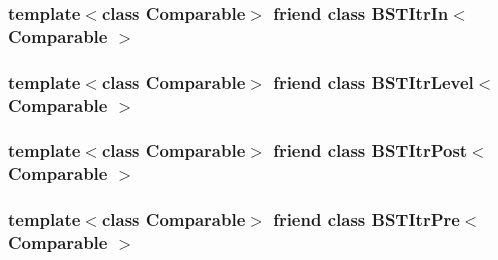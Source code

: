 \subsubsection[{B\+S\+T\+Itr\+In$<$ Comparable $>$}]{\setlength{\rightskip}{0pt plus 5cm}template$<$class Comparable$>$ friend class {\bf B\+S\+T\+Itr\+In}$<$ Comparable $>$\hspace{0.3cm}{\ttfamily [friend]}}\label{class_binary_node_aab3993acac2ab24a0b59edb0c3acc775}
\hypertarget{class_binary_node_a26ff00bc0d87069aed877f10fd3c80a8}{}
\subsubsection[{B\+S\+T\+Itr\+Level$<$ Comparable $>$}]{\setlength{\rightskip}{0pt plus 5cm}template$<$class Comparable$>$ friend class {\bf B\+S\+T\+Itr\+Level}$<$ Comparable $>$\hspace{0.3cm}{\ttfamily [friend]}}\label{class_binary_node_a26ff00bc0d87069aed877f10fd3c80a8}
\hypertarget{class_binary_node_a5dc153694be266f6e772659486219da7}{}
\subsubsection[{B\+S\+T\+Itr\+Post$<$ Comparable $>$}]{\setlength{\rightskip}{0pt plus 5cm}template$<$class Comparable$>$ friend class {\bf B\+S\+T\+Itr\+Post}$<$ Comparable $>$\hspace{0.3cm}{\ttfamily [friend]}}\label{class_binary_node_a5dc153694be266f6e772659486219da7}
\hypertarget{class_binary_node_a45a55df6f11541416d4ea7684c575c1a}{}
\subsubsection[{B\+S\+T\+Itr\+Pre$<$ Comparable $>$}]{\setlength{\rightskip}{0pt plus 5cm}template$<$class Comparable$>$ friend class {\bf B\+S\+T\+Itr\+Pre}$<$ Comparable $>$\hspace{0.3cm}{\ttfamily [friend]}}\label{class_binary_node_a45a55df6f11541416d4ea7684c575c1a}


